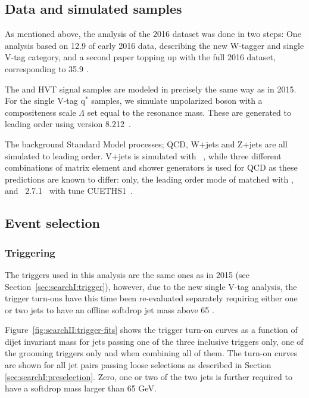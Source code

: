 \subsection{Data and simulated samples}
\label{sec:searchII:samples}
As mentioned above, the analysis of the 2016 dataset was done in two steps: One analysis based on 12.9 \fbinv of early 2016 data, describing the new W-tagger and single V-tag category, and a second paper topping up with the full 2016 dataset, corresponding to 35.9 \fbinv.\par
The \BulkG and HVT signal samples are modeled in precisely the same way as in 2015. For the single V-tag $\textrm{q}^*$ samples, we simulate unpolarized boson with a compositeness scale $\Lambda$ set equal to the resonance mass. These are generated to leading order using \PYTHIA version 8.212~\cite{Sjostrand:2007gs}. \par
The background Standard Model processes; QCD, W+jets and Z+jets are all simulated to leading order. V+jets is simulated with \amcatnlo~\cite{Alwall:2014hca,Alwall:2007fs}, while three different combinations of matrix element and shower generators is used for QCD as these predictions are known to differ: \PYTHIA only, the leading order mode of \amcatnlo{} matched with \PYTHIA, and \HERWIG{++}~2.7.1~\cite{Bahr:2008pv} with tune CUETHS1~\cite{Khachatryan:2015pea}.

\subsection{Event selection}
\subsubsection{Triggering}
The triggers used in this analysis are the same ones as in 2015 (see Section~\ref{sec:searchI:trigger}), however, due to the new single V-tag analysis, the trigger turn-ons have this time been re-evaluated separately requiring either one or two jets to have an offline softdrop jet mass above 65 \GeV.
\par Figure~\ref{fig:searchII:trigger-fits} shows the trigger turn-on curves as a function of dijet invariant mass for jets passing one of the three inclusive triggers only, one of the grooming triggers only and when combining all of them. The turn-on curves are shown for all jet pairs passing loose selections as described in Section \ref{sec:searchI:preselection}. Zero, one or two of the two jets is further required to have a softdrop mass larger than 65 GeV.

